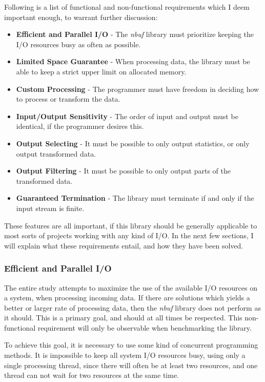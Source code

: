\documentclass[a4paper]{article}
\newcommand{\nbuf}{\textit{nbuf} }
\begin{document}
Following is a list of functional and non-functional requirements which I deem important enough, to warrant further discussion:

\begin{itemize}
\item \textbf{Efficient and Parallel I/O} - The \nbuf library must prioritize keeping the I/O resources busy as often as possible.
\item \textbf{Limited Space Guarantee} - When processing data, the library must be able to keep a strict upper limit on allocated memory.
\item \textbf{Custom Processing} - The programmer must have freedom in deciding how to process or transform the data.
\item \textbf{Input/Output Sensitivity} - The order of input and output must be identical, if the programmer desires this.
\item \textbf{Output Selecting} - It must be possible to only output statistics, or only output transformed data.
\item \textbf{Output Filtering} - It must be possible to only output parts of the transformed data.
\item \textbf{Guaranteed Termination} - The library must terminate if and only if the input stream is finite.
\end{itemize}

These features are all important, if this library should be generally applicable to most sorts of projects working with any kind of I/O. In the next few sections, I will explain what these requirements entail, and how they have been solved.

\subsubsection{Efficient and Parallel I/O}
The entire study attempts to maximize the use of the available I/O resources on a system, when processing incoming data. If there are solutions which yields a better or larger rate of processing data, then the \nbuf library does not perform as it should. This is a primary goal, and should at all times be respected. This non-functional requirement will only be observable when benchmarking the library.

To achieve this goal, it is necessary to use some kind of concurrent programming methods. It is impossible to keep all system I/O resources busy, using only a single processing thread, since there will often be at least two resources, and one thread can not wait for two resources at the same time. 
\end{document}
